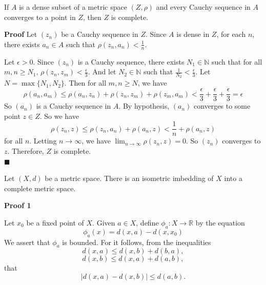 \documentclass[main.tex]{subfiles}
\begin{document}
\begin{lemma}
    If $A$ is a dense subset of a metric space $(Z, \rho)$ and every Cauchy sequence in $A$ converges to a point in $Z$, then $Z$ is complete. 
\end{lemma}
\par \noindent \textbf{Proof} Let $(z_n)$ be a Cauchy sequence in $Z$. Since $A$ is dense in $Z$, for each $n$, there exists $a_n \in A$ such that $\rho(z_n, a_n) < \frac{1}{n}$. 
\par Let $\epsilon > 0$. Since $(z_n)$ is a Cauchy sequence, there exists $N_1 \in \mathbb{N}$ such that for all $m, n \geq N_1$, $\rho(z_n, z_m) < \frac{\epsilon}{3}$.
And let $N_2 \in \mathbb{N}$ such that $\frac{1}{N_2} < \frac{\epsilon}{3}$. Let $N = \max\{N_1, N_2\}$. Then for all $m, n \geq N$, we have 
\begin{equation}
    \rho(a_n, a_m) \leq \rho(a_n, z_n) + \rho(z_n, z_m) + \rho(z_m, a_m) < \frac{\epsilon}{3} + \frac{\epsilon}{3} + \frac{\epsilon}{3} = \epsilon
\end{equation}
So $(a_n)$ is a Cauchy sequence in $A$. By hypothesis, $(a_n)$ converges to some point $z \in Z$. So we have 
\begin{equation}
    \rho(z_n, z) \leq \rho(z_n, a_n) + \rho(a_n, z) < \frac{1}{n} + \rho(a_n, z)
\end{equation}
for all $n$. Letting $n \rightarrow \infty$, we have $\lim_{n \to \infty} \rho(z_n, z) = 0$. So $(z_n)$ converges to $z$. Therefore, $Z$ is complete. 
\mbox{} \\ \null \hfill $\blacksquare$ 
\begin{theorem}
    Let $(X, d)$ be a metric space. There is an isometric imbedding of $X$ into a complete metric space. 
\end{theorem}
\par \noindent \textbf{Proof 1} 
\par Let $x_0$ be a fixed point of $X$. Given $a\in X$, define $\phi_a: X \rightarrow \mathbb{R}$ by the equation 
\begin{equation}
    \phi_a(x) = d(x, a) - d(x, x_0)
\end{equation}
We assert that $\phi_a$ is bounded. For it follows, from the inequalities 
\begin{equation}
    d(x, a) \leq d(x, b) + d(b, a), 
\end{equation}
\begin{equation}
    d(x, b) \leq d(x, a) + d(a, b),
\end{equation}
that 
\begin{equation}
    |d(x, a) - d(x, b)| \leq d(a, b). 
\end{equation}
\end{document}
